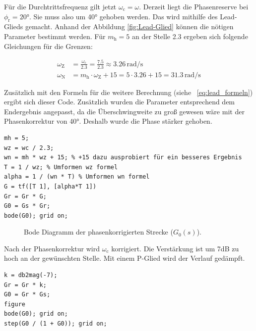 \documentclass[11pt,a4paper]{article}
\newlength\figureheight
\newlength\figurewidth
\begin{document}
\noindent Für die Durchtrittsfrequenz gilt jetzt $\omega_{\mathrm{c}} = \omega$. Derzeit liegt die Phasenreserve bei $\phi_{\mathrm{r}} = 20°$. Sie muss also um 40° gehoben werden. Das wird mithilfe des Lead-Glieds gemacht. Anhand der Abbildung \ref{fig:Lead-Glied} können die nötigen Parameter bestimmt werden. Für $m_{\mathrm{h}} = 5$ an der Stelle 2.3 ergeben sich folgende Gleichungen für die Grenzen:

\begin{equation}
\begin{aligned}
    \omega_{\mathrm{Z}} &= \frac{\omega_{\mathrm{c}}}{2.3} = \frac{7.5}{2.3} \approx 3.26\,\text{rad/s} \\[1.5ex]
    \omega_{\mathrm{N}} &= m_{\mathrm{h}} \cdot \omega_{\mathrm{Z}} + 15 = 5 \cdot 3.26 + 15 = 31.3\,\text{rad/s}
\end{aligned}
\end{equation}

\noindent Zusätzlich mit den Formeln für die weitere Berechnung (siehe ~\eqref{eq:lead_formeln}) ergibt sich dieser Code. Zusätzlich wurden die Parameter entsprechend dem Endergebnis angepasst, da die Überschwingweite zu groß gewesen wäre mit der Phasenkorrektur von 40°. Deshalb wurde die Phase stärker gehoben.

\begin{lstlisting}
mh = 5;
wz = wc / 2.3;
wn = mh * wz + 15; % +15 dazu ausprobiert für ein besseres Ergebnis
T = 1 / wz; % Umformen wz formel
alpha = 1 / (wn * T) % Umformen wn formel
G = tf([T 1], [alpha*T 1])
Gr = Gr * G;
G0 = Gs * Gr;
bode(G0); grid on; 
\end{lstlisting}

\begin{figure}[H]
    \centering
    \setlength\figureheight{6cm}
    \setlength{} %
    
    
    
    \caption{Bode Diagramm der phasenkorrigierten Strecke ($G_{\mathrm{0}}(s)$).}
    \label{fig:matlab_plot18}

\end{figure}

\noindent Nach der Phasenkorrektur wird $\omega_{\mathrm{c}}$ korrigiert. Die Verstärkung ist um 7dB zu hoch an der gewünschten Stelle. Mit einem P-Glied wird der Verlauf gedämpft.

\begin{lstlisting}
k = db2mag(-7);
Gr = Gr * k; 
G0 = Gr * Gs; 
figure
bode(G0); grid on;
step(G0 / (1 + G0)); grid on; 
\end{lstlisting}
\end{document}
